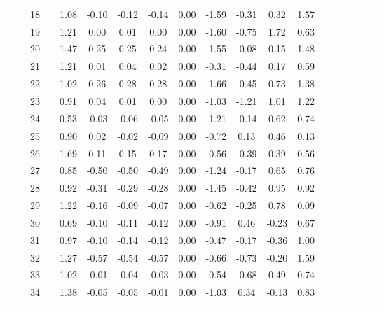 \documentclass[a4paper，11pt，oneside，openany]{jsbook}
\newcommand{\bhline}[1]{\noalign{\hrule height #1}}
\begin{document}
\begin{table}[h!]
\begin{center}
\begin{tabular}{ccccccccccccccccccc}
 &  & 18 &  & 1.08 & -0.10 & -0.12 & -0.14 & 0.00 & -1.59 & -0.31 & 0.32  & 1.57 \\
 &  & 19 &  & 1.21 & 0.00  & 0.01  & 0.00  & 0.00 & -1.60 & -0.75 & 1.72  & 0.63 \\
 &  & 20 &  & 1.47 & 0.25  & 0.25  & 0.24  & 0.00 & -1.55 & -0.08 & 0.15  & 1.48 \\
 &  & 21 &  & 1.21 & 0.01  & 0.04  & 0.02  & 0.00 & -0.31 & -0.44 & 0.17  & 0.59 \\
 &  & 22 &  & 1.02 & 0.26  & 0.28  & 0.28  & 0.00 & -1.66 & -0.45 & 0.73  & 1.38 \\
 &  & 23 &  & 0.91 & 0.04  & 0.01  & 0.00  & 0.00 & -1.03 & -1.21 & 1.01  & 1.22 \\
 &  & 24 &  & 0.53 & -0.03 & -0.06 & -0.05 & 0.00 & -1.21 & -0.14 & 0.62  & 0.74 \\
 &  & 25 &  & 0.90 & 0.02  & -0.02 & -0.09 & 0.00 & -0.72 & 0.13  & 0.46  & 0.13 \\
 &  & 26 &  & 1.69 & 0.11  & 0.15  & 0.17  & 0.00 & -0.56 & -0.39 & 0.39  & 0.56 \\
 &  & 27 &  & 0.85 & -0.50 & -0.50 & -0.49 & 0.00 & -1.24 & -0.17 & 0.65  & 0.76 \\
 &  & 28 &  & 0.92 & -0.31 & -0.29 & -0.28 & 0.00 & -1.45 & -0.42 & 0.95  & 0.92 \\
 &  & 29 &  & 1.22 & -0.16 & -0.09 & -0.07 & 0.00 & -0.62 & -0.25 & 0.78  & 0.09 \\
 &  & 30 &  & 0.69 & -0.10 & -0.11 & -0.12 & 0.00 & -0.91 & 0.46  & -0.23 & 0.67 \\
 &  & 31 &  & 0.97 & -0.10 & -0.14 & -0.12 & 0.00 & -0.47 & -0.17 & -0.36 & 1.00 \\
 &  & 32 &  & 1.27 & -0.57 & -0.54 & -0.57 & 0.00 & -0.66 & -0.73 & -0.20 & 1.59 \\
 &  & 33 &  & 1.02 & -0.01 & -0.04 & -0.03 & 0.00 & -0.54 & -0.68 & 0.49  & 0.74 \\
  &  & 34 &  & 1.38 & -0.05 & -0.05 & -0.01 & 0.00 & -1.03 & 0.34 & -0.13 & 0.83\\
\bhline{1pt}
\end{tabular}
\label{t3param}
\end{center}
\end{table}
\end{document}
